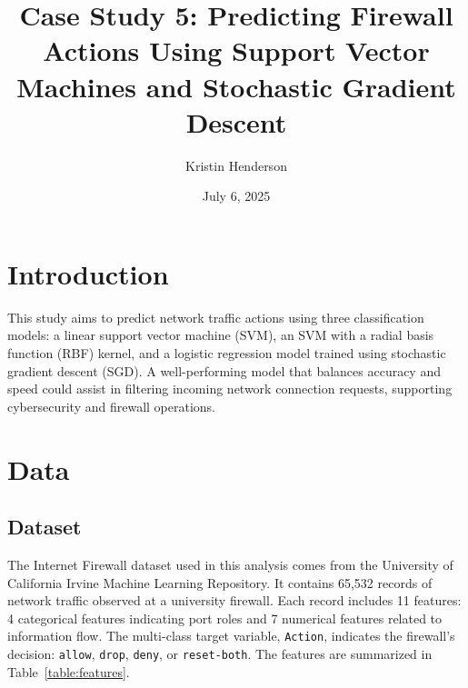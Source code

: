 \documentclass{article}      %
\title{Case Study 5: Predicting Firewall Actions Using Support Vector Machines and Stochastic Gradient Descent}
\author{Kristin Henderson}
\date{July 6, 2025}         %
\begin{document}

\maketitle                   %

\section{Introduction}       %

This study aims to predict network traffic actions using three classification models: a linear support vector machine (SVM), an SVM with a radial basis function (RBF) kernel, and a logistic regression model trained using stochastic gradient descent (SGD). A well-performing model that balances accuracy and speed could assist in filtering incoming network connection requests, supporting cybersecurity and firewall operations.

\section{Data}

\subsection{Dataset}

The Internet Firewall dataset used in this analysis comes from the University of California Irvine Machine Learning Repository. It contains 65,532 records of network traffic observed at a university firewall. Each record includes 11 features: 4 categorical features indicating port roles and 7 numerical features related to information flow. The multi-class target variable, \texttt{Action}, indicates the firewall's decision: \texttt{allow}, \texttt{drop}, \texttt{deny}, or \texttt{reset-both}. The features are summarized in Table~\ref{table:features}.
\end{document}
